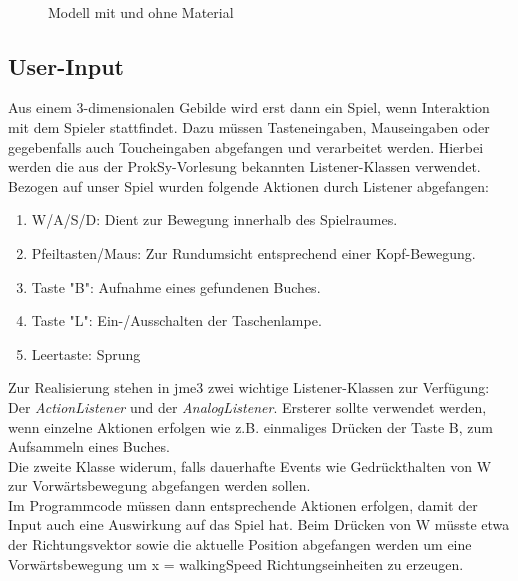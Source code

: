 \begin{figure}[h!]
	\myfloatalign
	 \quad
	 \\
	\caption[Materials auf Modellen]{Modell mit und ohne Material \cite{Fig1}}\label{fig:example}
	
\end{figure}







\subsection{User-Input}

Aus einem 3-dimensionalen Gebilde wird erst dann ein Spiel, wenn Interaktion mit dem Spieler stattfindet. Dazu müssen Tasteneingaben, Mauseingaben oder gegebenfalls auch Toucheingaben abgefangen und verarbeitet werden.
Hierbei werden die aus der ProkSy-Vorlesung bekannten Listener-Klassen verwendet.
Bezogen auf unser Spiel wurden folgende Aktionen durch Listener abgefangen:
\begin{enumerate}
	\item W/A/S/D: Dient zur Bewegung innerhalb des Spielraumes.
	\item Pfeiltasten/Maus: Zur Rundumsicht entsprechend einer Kopf-Bewegung.
	\item Taste "B": Aufnahme eines gefundenen Buches.
	\item Taste "L": Ein-/Ausschalten der Taschenlampe.
	\item Leertaste: Sprung
\end{enumerate} Zur Realisierung stehen in jme3 zwei wichtige Listener-Klassen zur Verfügung: Der \emph{ActionListener} und der \emph{AnalogListener}.
Ersterer sollte verwendet werden, wenn einzelne Aktionen erfolgen wie z.B. einmaliges Drücken der Taste B, zum Aufsammeln eines Buches.\\
Die zweite Klasse widerum, falls dauerhafte Events wie Gedrückthalten von W zur Vorwärtsbewegung abgefangen werden sollen. \\
Im Programmcode müssen dann entsprechende Aktionen erfolgen, damit der Input auch eine Auswirkung auf das Spiel hat. Beim Drücken von W müsste etwa der Richtungsvektor sowie die aktuelle Position abgefangen werden um eine Vorwärtsbewegung um x = walkingSpeed Richtungseinheiten zu erzeugen.

